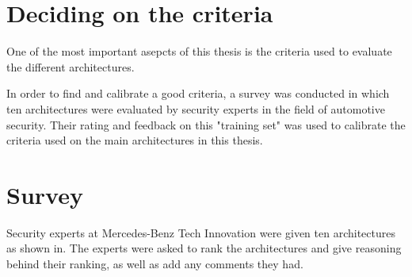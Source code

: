 \chapter{Deciding on the criteria}
\label{chp:criteria}

One of the most important asepcts of this thesis is the criteria used to evaluate the different architectures.

In order to find and calibrate a good criteria, a survey was conducted in which ten architectures were evaluated by security experts in the field of automotive security.
Their rating and feedback on this "training set" was used to calibrate the criteria used on the main architectures in this thesis.

\chapter{Survey}
\label{chp:survey}

Security experts at Mercedes-Benz Tech Innovation were given ten architectures as shown in.
The experts were asked to rank the architectures and give reasoning behind their ranking, as well as add any comments they had.

